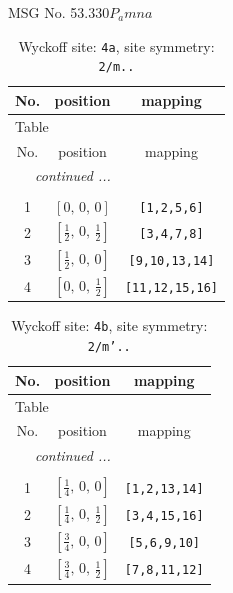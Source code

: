 \documentclass[fleqn,8pt]{jsarticle}
\begin{document}
\setcounter{MaxMatrixCols}{32}

\renewcommand{\tablename}{Table~}
\renewcommand{\figurename}{Figure~}
\begin{center}
\LARGE
MSG No. 53.330\quad$P_{a}mna$
\end{center}
\renewcommand{\arraystretch}{1.2}
\begin{longtable}{ccc}
\caption{Wyckoff site: {\tt 4a}, site symmetry: {\tt 2/m..}}
 \\
 \hline \hline
No. & position & mapping \\ \hline \endfirsthead

\multicolumn{2}{l}{\tablename\ \thetable{}} \\
 \hline \hline
No. & position & mapping \\ \hline \endhead

 \hline \hline
\multicolumn{2}{r}{\footnotesize\it continued ...} \\ \endfoot

 \hline \hline
\multicolumn{2}{r}{} \\ \endlastfoot

1 & $\left[ 0,\, 0,\, 0 \right]$ & {\tt [1,2,5,6]} \\ \hline
2 & $\left[ \frac{1}{2},\, 0,\, \frac{1}{2} \right]$ & {\tt [3,4,7,8]} \\ \hline
3 & $\left[ \frac{1}{2},\, 0,\, 0 \right]$ & {\tt [9,10,13,14]} \\ \hline
4 & $\left[ 0,\, 0,\, \frac{1}{2} \right]$ & {\tt [11,12,15,16]} \\
\end{longtable}
\renewcommand{\arraystretch}{1.2}
\begin{longtable}{ccc}
\caption{Wyckoff site: {\tt 4b}, site symmetry: {\tt 2/m'..}}
 \\
 \hline \hline
No. & position & mapping \\ \hline \endfirsthead

\multicolumn{2}{l}{\tablename\ \thetable{}} \\
 \hline \hline
No. & position & mapping \\ \hline \endhead

 \hline \hline
\multicolumn{2}{r}{\footnotesize\it continued ...} \\ \endfoot

 \hline \hline
\multicolumn{2}{r}{} \\ \endlastfoot

1 & $\left[ \frac{1}{4},\, 0,\, 0 \right]$ & {\tt [1,2,13,14]} \\ \hline
2 & $\left[ \frac{1}{4},\, 0,\, \frac{1}{2} \right]$ & {\tt [3,4,15,16]} \\ \hline
3 & $\left[ \frac{3}{4},\, 0,\, 0 \right]$ & {\tt [5,6,9,10]} \\ \hline
4 & $\left[ \frac{3}{4},\, 0,\, \frac{1}{2} \right]$ & {\tt [7,8,11,12]} \\
\end{longtable}
\end{document}
